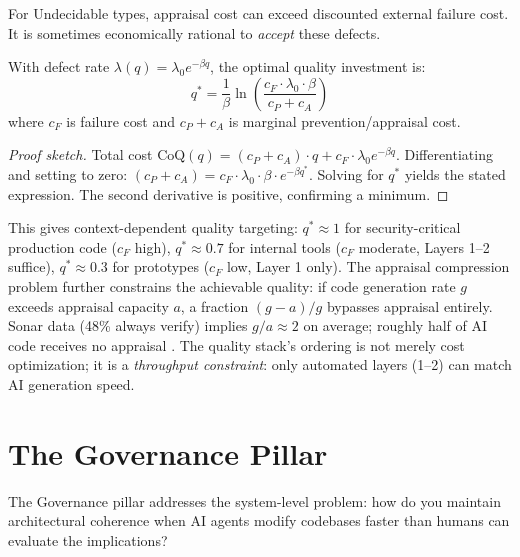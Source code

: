 For Undecidable types, appraisal cost can exceed discounted external failure cost. It is sometimes economically rational to \emph{accept} these defects.

\begin{theorem}
\label{thm:optquality}
With defect rate $\lambda(q) = \lambda_0 e^{-\beta q}$, the optimal quality investment is:
\begin{equation}
q^* = \frac{1}{\beta} \ln\!\left(\frac{c_F \cdot \lambda_0 \cdot \beta}{c_P + c_A}\right)
\end{equation}
where $c_F$ is failure cost and $c_P + c_A$ is marginal prevention/appraisal cost.
\end{theorem}

\begin{proof}[Proof sketch]
Total cost $\text{CoQ}(q) = (c_P + c_A) \cdot q + c_F \cdot \lambda_0 e^{-\beta q}$. Differentiating and setting to zero: $(c_P + c_A) = c_F \cdot \lambda_0 \cdot \beta \cdot e^{-\beta q^*}$. Solving for $q^*$ yields the stated expression. The second derivative is positive, confirming a minimum.
\end{proof}

This gives context-dependent quality targeting: $q^* \approx 1$ for security-critical production code ($c_F$ high), $q^* \approx 0.7$ for internal tools ($c_F$ moderate, Layers 1--2 suffice), $q^* \approx 0.3$ for prototypes ($c_F$ low, Layer 1 only). The appraisal compression problem further constrains the achievable quality: if code generation rate $g$ exceeds appraisal capacity $a$, a fraction $(g-a)/g$ bypasses appraisal entirely. Sonar data (48\% always verify) implies $g/a \approx 2$ on average; roughly half of AI code receives no appraisal \citep{sonar2026}. The quality stack's ordering is not merely cost optimization; it is a \emph{throughput constraint}: only automated layers (1--2) can match AI generation speed.


\section{The Governance Pillar}
\label{sec:governance}

The Governance pillar \citep{pillar-governance} addresses the system-level problem: how do you maintain architectural coherence when AI agents modify codebases faster than humans can evaluate the implications?

